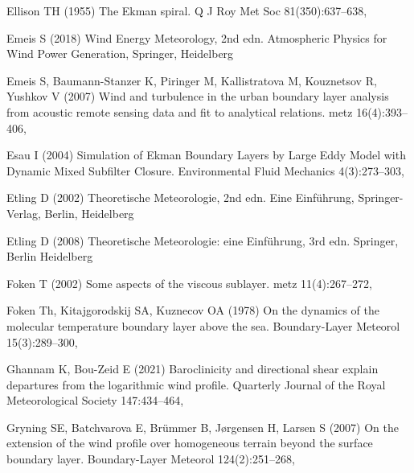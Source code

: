 \documentclass[smallcondensed,final]{svjour3}
\begin{document}
\begin{thebibliography}{57}
Ellison TH (1955) The {{Ekman}} spiral. Q J Roy Met Soc 81(350):637--638,

Emeis S (2018) Wind {{Energy Meteorology}}, 2nd edn. Atmospheric {{Physics}}
  for {{Wind Power Generation}}, Springer, Heidelberg

Emeis S, {Baumann-Stanzer} K, Piringer M, Kallistratova M, Kouznetsov R,
  Yushkov V (2007) Wind and turbulence in the urban boundary layer analysis
  from acoustic remote sensing data and fit to analytical relations. metz
  16(4):393--406, 

Esau I (2004) Simulation of {{Ekman Boundary Layers}} by {{Large Eddy Model}}
  with {{Dynamic Mixed Subfilter Closure}}. Environmental Fluid Mechanics
  4(3):273--303, 

Etling D (2002) Theoretische {{Meteorologie}}, 2nd edn. Eine
  {{Einf{\"u}hrung}}, Springer-Verlag, Berlin, Heidelberg

Etling D (2008) {Theoretische Meteorologie: eine Einf{\"u}hrung}, 3rd edn.
  Springer, Berlin Heidelberg

Foken T (2002) Some aspects of the viscous sublayer. metz 11(4):267--272,

Foken {\relax Th}, Kitajgorodskij SA, Kuznecov OA (1978) On the dynamics of the
  molecular temperature boundary layer above the sea. Boundary-Layer Meteorol
  15(3):289--300, 

Ghannam K, {Bou-Zeid} E (2021) Baroclinicity and directional shear explain
  departures from the logarithmic wind profile. Quarterly Journal of the Royal
  Meteorological Society 147:434--464, 

Gryning SE, Batchvarova E, Br{\"u}mmer B, J{\o}rgensen H, Larsen S (2007) On
  the extension of the wind profile over homogeneous terrain beyond the surface
  boundary layer. Boundary-Layer Meteorol 124(2):251--268,


\end{thebibliography}
\end{document}
